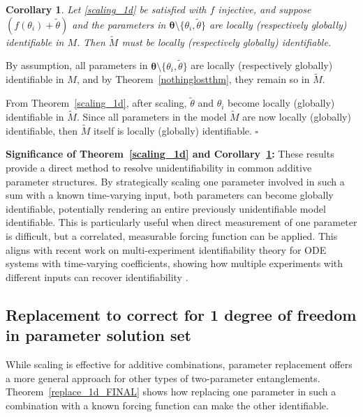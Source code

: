 \documentclass[a4paper,fleqn]{cas-dc}
\newtheorem{corollary}{Corollary}
\theoremstyle{definition}
\begin{document}
\begin{corollary}\label{cor3}
   Let \cref{scaling_1d} be satisfied with $f$ injective, and suppose $(f(\theta_i) + \tilde{\theta})$ and the parameters in $\pmb{\theta} \setminus \{\theta_i, \tilde{\theta} \}$ are locally (respectively globally) identifiable in $M$.
   Then $\tilde{M}$ must be locally (respectively globally) identifiable. 
\end{corollary}
\begin{pf}
    By assumption, all parameters in $\pmb{\theta} \setminus \{\theta_i, \tilde{\theta} \}$ are locally (respectively globally) identifiable in $M$, and by Theorem~\ref{nothinglostthm}, they remain so in $\tilde{M}$.
    
    From Theorem~\ref{scaling_1d}, after scaling,  $\tilde{\theta}$ and $\theta_i$ become locally (globally) identifiable in $\tilde{M}$.
    Since all parameters in the model $\tilde{M}$ are now locally (globally) identifiable, then $\tilde{M}$ itself is locally (globally) identifiable. $\square$
\end{pf}

\noindent \textbf{Significance of Theorem~\ref{scaling_1d} and Corollary~\ref{cor3}:} These results provide a direct method to resolve unidentifiability in common additive parameter structures. By strategically scaling one parameter involved in such a sum with a known time-varying input, both parameters can become globally identifiable, potentially rendering an entire previously unidentifiable model identifiable. This is particularly useful when direct measurement of one parameter is difficult, but a correlated, measurable forcing function can be applied. This aligns with recent work on multi-experiment identifiability theory for ODE systems with time-varying coefficients, showing how multiple experiments with different inputs can recover identifiability \cite{ovchinnikov2022multiexperiment}.

\subsection{Replacement to correct for 1 degree of freedom in parameter solution set} \label{Sss:UnidentNonlinReplace_forcefunc}
\noindent While scaling is effective for additive combinations, parameter replacement offers a more general approach for other types of two-parameter entanglements. Theorem~\ref{replace_1d_FINAL} shows how replacing one parameter in such a combination with a known forcing function can make the other identifiable.
\end{document}
